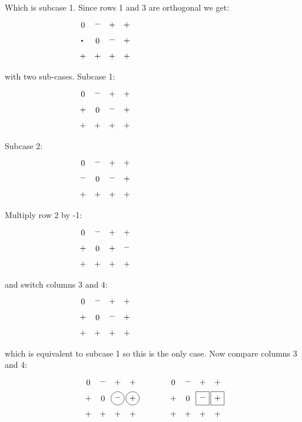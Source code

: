 Which is subcase 1.  Since rows 1 and 3 are orthogonal we get:
\begin{equation*}
\myarrset
\begin{array}{cccc}
\ndcz & \ndcm & \ndsp & \ndcp \\
\ndcd & \ndcz & \ndcm & \ndcp \\
\ndsp & \ndcp & \ndcp & \ndsp
\end{array}
~~~~~~~~~~~~~~~~~~~~~~~~~~~~~~~~~~~
\end{equation*}
with two sub-cases.  Subcase 1:
\begin{equation*}
\myarrset
\begin{array}{cccc}
\ndcz & \ndcm & \ndsp & \ndcp \\
\ndcp & \ndcz & \ndcm & \ndcp \\
\ndsp & \ndcp & \ndcp & \ndsp
\end{array}
~~~~~~~~~~~~~~~~~~~~~~~~~~~~~~~~~~~
\end{equation*}
Subcase 2:
\begin{equation*}
\myarrset
\begin{array}{cccc}
\ndcz & \ndcm & \ndsp & \ndcp \\
\ndcm & \ndcz & \ndcm & \ndcp \\
\ndsp & \ndcp & \ndcp & \ndsp
\end{array}
~~~~~~~~~~~~~~~~~~~~~~~~~~~~~~~~~~~
\end{equation*}
Multiply row 2 by -1:
\begin{equation*}
\myarrset
\begin{array}{cccc}
\ndcz & \ndcm & \ndsp & \ndcp \\
\ndcp & \ndcz & \ndcp & \ndcm \\
\ndsp & \ndcp & \ndcp & \ndsp
\end{array}
~~~~~~~~~~~~~~~~~~~~~~~~~~~~~~~~~~~
\end{equation*}
and switch columns 3 and 4:
\begin{equation*}
\myarrset
\begin{array}{cccc}
\ndcz & \ndcm & \ndsp & \ndcp \\
\ndcp & \ndcz & \ndcm & \ndcp \\
\ndsp & \ndcp & \ndcp & \ndsp
\end{array}
~~~~~~~~~~~~~~~~~~~~~~~~~~~~~~~~~~~
\end{equation*}
which is equivalent to subcase 1 so this is the only case.
Now compare columns 3 and 4:
\begin{equation*}
\myarrset
\begin{array}{ccccccccc}
\ndcz & \ndcm & \ndcp & \ndcp & ~~~~~~~~~ & \ndcz & \ndcm & \ndcp & \ndcp \\
\ndcp & \ndcz & \dcm  & \dcp  & ~~~~~~~~~ & \ndcp & \ndcz & \dsm  & \dsp  \\
\ndcp & \ndcp & \ndcp & \ndcp & ~~~~~~~~~ & \ndcp & \ndcp & \ndcp & \ndcp
\end{array}
\end{equation*}
